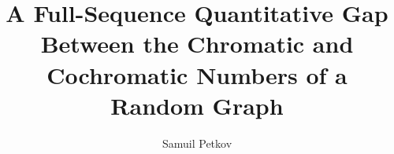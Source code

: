 \documentclass[11pt,reqno]{amsart}
\title[Chromatic and cochromatic numbers]{A Full-Sequence Quantitative Gap
Between the Chromatic and Cochromatic Numbers of a Random Graph}
\author[Samuil Petkov]{Samuil Petkov}
\begin{document}







\renewcommand{\bibsection}{\section*{References}}


\end{document}
